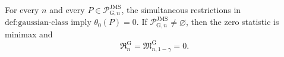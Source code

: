 For every \(n\) and every \(P\in\mathcal P_{\mathrm G,n}^{\mathrm{JMS}}\), the simultaneous restrictions in \(\text{def:gaussian-class}\) imply \(\theta_0(P)=0\). If \(\mathcal P_{\mathrm G,n}^{\mathrm{JMS}}\neq\varnothing\), then the zero statistic is minimax and
\[
 \mathfrak R_n^{\mathrm G}
 =\mathfrak M_{n,1-\gamma}^{\mathrm G}
 =0.
\]